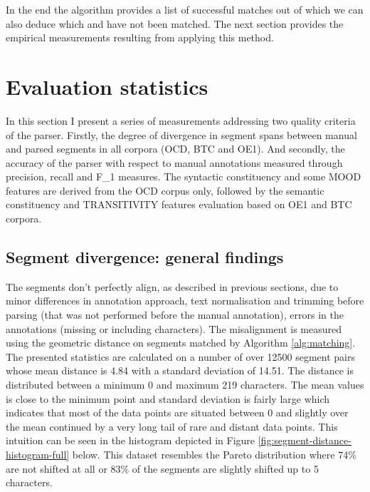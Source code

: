     In the end the algorithm provides a list of successful matches out of which we can also deduce which \aslist and \mslist have not been matched. The next section provides the empirical measurements resulting from applying this method. 

\section{Evaluation statistics}
\label{sec:results}

    In this section I present a series of measurements addressing two quality criteria of the parser. Firstly, the degree of divergence in segment spans between manual and parsed segments in all corpora (OCD, BTC and OE1). And secondly, the accuracy of the parser with respect to manual annotations measured through precision, recall and F_1 measures. The syntactic constituency and some MOOD features are derived from the OCD corpus only, followed by the semantic constituency and TRANSITIVITY features evaluation based on OE1 and BTC corpora. 

\subsection{Segment divergence: general findings}

    The segments don't perfectly align, as described in previous sections, due to minor differences in annotation approach, text normalisation and trimming before parsing (that was not performed before the manual annotation), errors in the annotations (missing or including characters). The misalignment is measured using the geometric distance 
    on segments matched by Algorithm \ref{alg:matching}. The presented statistics are calculated on a number of over 12500 segment pairs whose mean distance is 4.84 with a standard deviation of 14.51. The distance is distributed between a minimum 0 and maximum 219 characters. The mean values is close to the minimum point and standard deviation is fairly large which indicates that most of the data points are situated between 0 and slightly over the mean continued by a very long tail of rare and distant data points. This intuition can be seen in the histogram depicted in Figure \ref{fig:segment-distance-histogram-full} below. This dataset resembles the Pareto distribution where 74\% are not shifted at all or 83\% of the segments are slightly shifted up to 5 characters.

